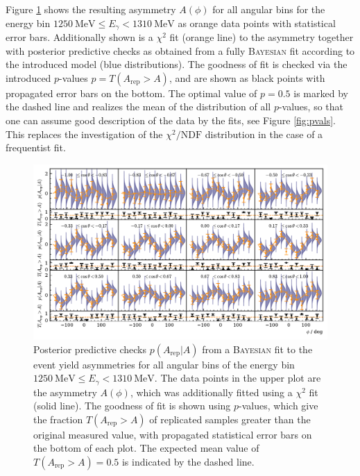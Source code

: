 Figure \ref{fig:asym} shows the resulting asymmetry $A(\phi)$ for all angular bins for the energy bin $\SI{1250}{\mega\eV}\leq E_\gamma<\SI{1310}{\mega\eV}$ as orange data points with statistical error bars.  Additionally shown is a $\chi^2$ fit (orange line) to the asymmetry together with posterior predictive checks as obtained from a fully \textsc{Bayesian} fit according to the introduced model (blue distributions). The goodness of fit is checked via the introduced $p$-values $p=T(A_\text{rep}>A)$, and are shown as black points with propagated error bars on the bottom. The optimal value of $p=0.5$ is marked by the dashed line and realizes the mean of the distribution of all $p$-values, so that one can assume good description of the data by the fits, see Figure \ref{fig:pvals}. This replaces the investigation of the $\chi^2/\text{NDF}$ distribution in the case of a frequentist fit.   
\newpage
\begin{landscape}
	\begin{figure}[htbp]
		\centering
		\includegraphics[width=\linewidth,height=.8\textwidth]{../bayes/realdeal/plots/ppd_checks.pdf}
		\caption{Posterior predictive checks $p\left(A_\text{rep}\big|A\right)$ from a \textsc{Bayesian} fit to the event yield asymmetries for all angular bins of the energy bin $\SI{1250}{\mega\eV}\leq E_\gamma<\SI{1310}{\mega\eV}$. The data points in the upper plot are the asymmetry $A\left(\phi\right)$, which was additionally fitted using a $\chi^2$ fit (solid line). The goodness of fit is shown using $p$-values, which give the fraction $T\left(A_\text{rep}>A\right)$ of replicated samples greater than the original measured value, with propagated statistical error bars on the bottom of each plot. The expected mean value of $T\left(A_\text{rep}>A\right)=0.5$ is indicated by the dashed line. }
		\label{fig:asym}
	\end{figure}
\end{landscape}
\newpage


